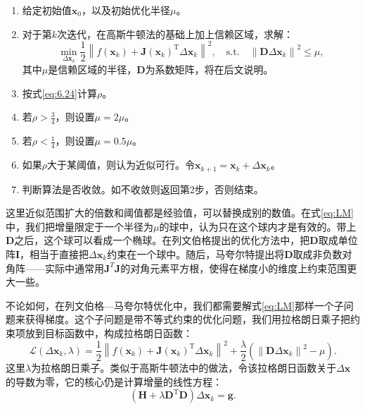 \begin{mdframed}
\begin{enumerate}
	\item 给定初始值$\bm{x}_0$，以及初始优化半径$\mu$。
	\item 对于第$k$次迭代，在高斯牛顿法的基础上加上信赖区域，求解：
	\begin{equation}\label{eq:LM}
	\mathop {\min }\limits_{\Delta \bm{x}_k} \frac{1}{2}{\left\| {f\left( \bm{x}_k \right) + \bm{J} \left( \bm{x}_k \right)^\mathrm{T} \Delta \bm{x}_k} \right\|^2}, \quad \mathrm{s.t.}\quad {\left\| {\bm{D} \Delta \bm{x}_k} \right\|^2} \leqslant \mu ,
	\end{equation}
	其中$\mu$是信赖区域的半径，$\bm{D}$为系数矩阵，将在后文说明。
	\item 按式\eqref{eq:6.24}计算$\rho$。
	\item 若$\rho > \frac{3}{4}$，则设置$\mu = 2 \mu$。
	\item 若$\rho < \frac{1}{4}$，则设置$\mu = 0.5 \mu$。
	\item 如果$\rho$大于某阈值，则认为近似可行。令$\bm{x}_{k+1} = \bm{x}_k+\Delta \bm{x}_k$。
	\item 判断算法是否收敛。如不收敛则返回第2步，否则结束。
\end{enumerate}
 \end{mdframed}

这里近似范围扩大的倍数和阈值都是经验值，可以替换成别的数值。在式\eqref{eq:LM}中，我们把增量限定于一个半径为$\mu$的球中，认为只在这个球内才是有效的。带上$\bm{D}$之后，这个球可以看成一个椭球。在列文伯格提出的优化方法中，把$\bm{D}$取成单位阵$\bm{I}$，相当于直接把$\Delta \bm{x}_k$约束在一个球中。随后，马夸尔特提出将$\bm{D}$取成非负数对角阵——实际中通常用$\bm{J}^T \bm{J}$的对角元素平方根，使得在梯度小的维度上约束范围更大一些。

不论如何，在列文伯格—马夸尔特优化中，我们都需要解式\eqref{eq:LM}那样一个子问题来获得梯度。这个子问题是带不等式约束的优化问题，我们用拉格朗日乘子把约束项放到目标函数中，构成拉格朗日函数：
\begin{equation}
\mathcal{L}(\Delta \bm{x}_k, \lambda)= \frac{1}{2} {\left\| {f\left( \bm{x}_k \right) + \bm{J} \left( \bm{x}_k \right)^\mathrm{T} \Delta \bm{x}_k} \right\|^2} + \frac{\lambda}{2} \left( \left\| \bm{D} \Delta \bm{x}_k \right\|^2 - \mu \right).
\end{equation}
这里$\lambda$为拉格朗日乘子。类似于高斯牛顿法中的做法，令该拉格朗日函数关于$\Delta \bm{x}$的导数为零，它的核心仍是计算增量的线性方程：
\begin{equation}
\left( \bm{H} +\lambda \bm{D}^\mathrm{T} \bm{D} \right) \Delta \bm{x}_k = \bm{g}.
\end{equation}


